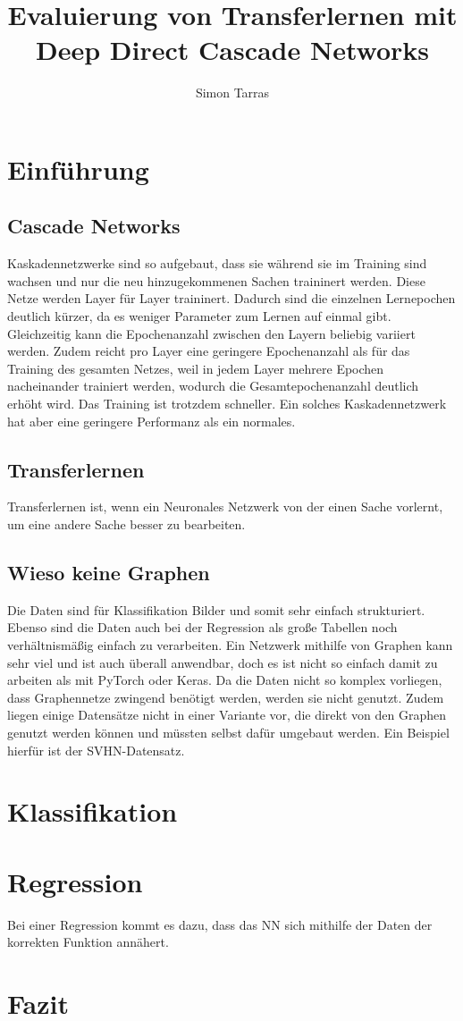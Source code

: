 \documentclass[ngerman]{report}
\title{Evaluierung von Transferlernen mit Deep Direct Cascade Networks}
\author{Simon Tarras}
\begin{document}
    \maketitle
    \tableofcontents
    \chapter{Einführung}
        \section{Cascade Networks}
        Kaskadennetzwerke sind so aufgebaut, dass sie während sie 
        im Training sind wachsen und nur die neu hinzugekommenen 
        Sachen traininert werden. \cite{cascor}
        Diese Netze werden Layer für Layer traininert. Dadurch sind die 
        einzelnen Lernepochen deutlich kürzer, da es weniger Parameter 
        zum Lernen auf einmal gibt. Gleichzeitig kann die Epochenanzahl 
        zwischen den Layern beliebig variiert werden. Zudem reicht pro 
        Layer eine geringere Epochenanzahl als für das Training des 
        gesamten Netzes, weil in jedem Layer mehrere Epochen nacheinander 
        trainiert werden, wodurch die Gesamtepochenanzahl deutlich erhöht wird. 
        Das Training ist trotzdem schneller. Ein solches Kaskadennetzwerk 
        hat aber eine geringere Performanz als ein normales. 
        \section{Transferlernen}
        Transferlernen ist, wenn ein Neuronales Netzwerk von der 
        einen Sache vorlernt, um eine andere Sache besser zu 
        bearbeiten.
        \section{Wieso keine Graphen}
        Die Daten sind für Klassifikation Bilder und somit sehr einfach strukturiert. 
        Ebenso sind die Daten auch bei der Regression als große Tabellen noch 
        verhältnismäßig einfach zu verarbeiten. 
        Ein Netzwerk mithilfe von Graphen kann sehr viel und ist auch überall anwendbar, 
        doch es ist nicht so einfach damit zu arbeiten als mit PyTorch oder Keras.
        Da die Daten nicht so komplex vorliegen, dass Graphennetze zwingend benötigt 
        werden, werden sie nicht genutzt. Zudem liegen einige Datensätze nicht in einer 
        Variante vor, die direkt von den Graphen genutzt werden können und müssten 
        selbst dafür umgebaut werden. Ein Beispiel hierfür ist 
        der SVHN-Datensatz.
    \chapter{Klassifikation}
    
    
    \chapter{Regression}
    Bei einer Regression kommt es dazu, dass das NN sich mithilfe 
    der Daten der korrekten Funktion annähert.

    \chapter{Fazit}
    \printbibliography
\end{document}
